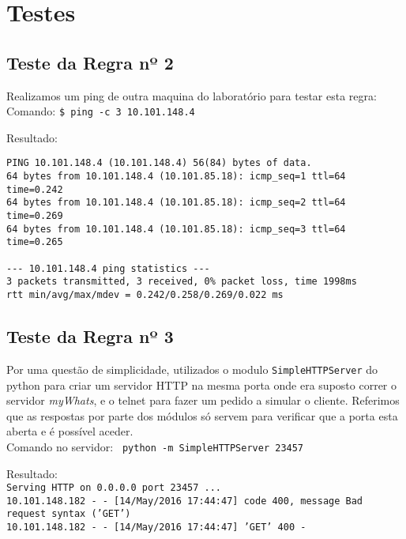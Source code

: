 \documentclass[12pt, a4paper, twoside]{report} %
\begin{document}
\clearpage

\section{Testes}

\subsection{Teste da Regra nº 2}

\noindent Realizamos um ping de outra maquina do laboratório para testar esta regra: \\

\noindent Comando: \texttt{\$ ping -c 3 10.101.148.4}

\noindent Resultado:

\begin{lstlisting}
PING 10.101.148.4 (10.101.148.4) 56(84) bytes of data.
64 bytes from 10.101.148.4 (10.101.85.18): icmp_seq=1 ttl=64 time=0.242
64 bytes from 10.101.148.4 (10.101.85.18): icmp_seq=2 ttl=64 time=0.269
64 bytes from 10.101.148.4 (10.101.85.18): icmp_seq=3 ttl=64 time=0.265

--- 10.101.148.4 ping statistics ---
3 packets transmitted, 3 received, 0% packet loss, time 1998ms
rtt min/avg/max/mdev = 0.242/0.258/0.269/0.022 ms
\end{lstlisting}

\subsection{Teste da Regra nº 3}

\noindent Por uma questão de simplicidade, utilizados o modulo \texttt{SimpleHTTPServer} do python para criar um servidor HTTP na mesma porta onde era suposto correr o servidor \textit{myWhats}, e o telnet para fazer um pedido a simular o cliente. Referimos que as respostas por parte dos módulos só servem para verificar que a porta esta aberta e é possível aceder. \\

\noindent Comando no servidor: \texttt{ python -m SimpleHTTPServer 23457}

\noindent Resultado: \\

\noindent \texttt{Serving HTTP on 0.0.0.0 port 23457 ...} \\
\noindent \texttt{10.101.148.182 - - [14/May/2016 17:44:47] code 400, message Bad request syntax ('GET')} \\
\texttt{10.101.148.182 - - [14/May/2016 17:44:47] 'GET' 400 -} \\
\end{document}

